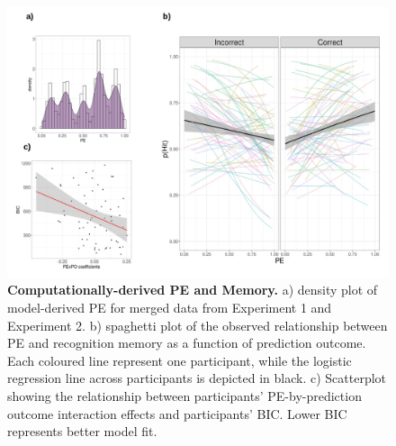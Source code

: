\documentclass[a4paper,12pt]{article}
\begin{document}
\begin{figure}[ht!]
\centerline
{\includegraphics[width=1\textwidth]{figures/comp_derivedPE_memory.jpg}} 
\caption{\textbf{Computationally-derived PE and Memory.} a)   density plot of model-derived PE for merged data from Experiment 1 and Experiment 2. b) spaghetti plot of the observed relationship between PE and recognition memory as a function of prediction outcome. Each coloured line represent one participant, while the logistic regression line across participants is depicted in black. c) Scatterplot showing the relationship between participants' PE-by-prediction outcome interaction effects and participants' BIC. Lower BIC represents better model fit.  }
\label{fig:PE_mem}
\end{figure}
\end{document}
